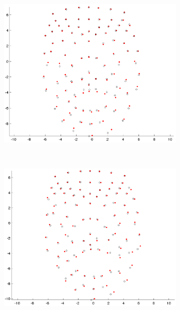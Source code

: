 \begin{figure}[htbp!]
\begin{subfigure}[b]{0.3\textwidth}
        \end{subfigure}
        ~ %
        \begin{subfigure}[b]{0.3\textwidth}
                \includegraphics[width=\textwidth]{img/weights/3D/w2/w2_frame600_blends68.png} 
        \end{subfigure} \\
                \begin{subfigure}[b]{0.3\textwidth}
                \includegraphics[width=\textwidth]{img/weights/3D/w3/w3_200.png}

\end{subfigure}
\end{figure}

